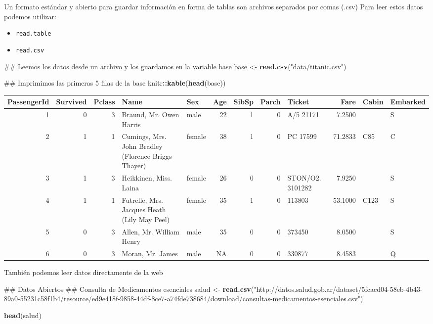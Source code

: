 \documentclass[spanish,]{book}
\newenvironment{Shaded}{\begin{snugshade}}{\end{snugshade}}
\newcommand{\KeywordTok}[1]{\textcolor[rgb]{0.13,0.29,0.53}{\textbf{#1}}}
\newcommand{\StringTok}[1]{\textcolor[rgb]{0.31,0.60,0.02}{#1}}
\newcommand{\OperatorTok}[1]{\textcolor[rgb]{0.81,0.36,0.00}{\textbf{#1}}}
\newcommand{\NormalTok}[1]{#1}
\providecommand{\tightlist}{%
  \setlength{\itemsep}{0pt}\setlength{\parskip}{0pt}}
\begin{document}
Un formato estándar y abierto para guardar información en forma de
tablas son archivos separados por comas (.csv) Para leer estos datos
podemos utilizar:

\begin{itemize}
\tightlist
\item
  \texttt{read.table}
\item
  \texttt{read.csv}
\end{itemize}

\begin{Shaded}
\begin{Highlighting}[]
\NormalTok{## Leemos los datos desde un archivo y los guardamos en la variable base}
\NormalTok{base <-}\StringTok{ }\KeywordTok{read.csv}\NormalTok{(}\StringTok{"data/titanic.csv"}\NormalTok{)}

\NormalTok{## Imprimimos las primeras 5 filas de la base}
\NormalTok{knitr}\OperatorTok{::}\KeywordTok{kable}\NormalTok{(}\KeywordTok{head}\NormalTok{(base))}
\end{Highlighting}
\end{Shaded}

\begin{tabular}{r|r|r|l|l|r|r|r|l|r|l|l}
\hline
PassengerId & Survived & Pclass & Name & Sex & Age & SibSp & Parch & Ticket & Fare & Cabin & Embarked\\
\hline
1 & 0 & 3 & Braund, Mr. Owen Harris & male & 22 & 1 & 0 & A/5 21171 & 7.2500 &  & S\\
\hline
2 & 1 & 1 & Cumings, Mrs. John Bradley (Florence Briggs Thayer) & female & 38 & 1 & 0 & PC 17599 & 71.2833 & C85 & C\\
\hline
3 & 1 & 3 & Heikkinen, Miss. Laina & female & 26 & 0 & 0 & STON/O2. 3101282 & 7.9250 &  & S\\
\hline
4 & 1 & 1 & Futrelle, Mrs. Jacques Heath (Lily May Peel) & female & 35 & 1 & 0 & 113803 & 53.1000 & C123 & S\\
\hline
5 & 0 & 3 & Allen, Mr. William Henry & male & 35 & 0 & 0 & 373450 & 8.0500 &  & S\\
\hline
6 & 0 & 3 & Moran, Mr. James & male & NA & 0 & 0 & 330877 & 8.4583 &  & Q\\
\hline
\end{tabular}

También podemos leer datos directamente de la web

\begin{Shaded}
\begin{Highlighting}[]
\NormalTok{## Datos Abiertos}
\NormalTok{## Consulta de Medicamentos esenciales}
\NormalTok{salud <-}\StringTok{ }\KeywordTok{read.csv}\NormalTok{(}\StringTok{"http://datos.salud.gob.ar/dataset/5fcacd04-58eb-4b43-89a0-55231c58f1b4/resource/ed9e418f-9858-44df-8ce7-a74fde738684/download/consultas-medicamentos-esenciales.csv"}\NormalTok{)}

\KeywordTok{head}\NormalTok{(salud)}
\end{Highlighting}
\end{Shaded}
\end{document}
